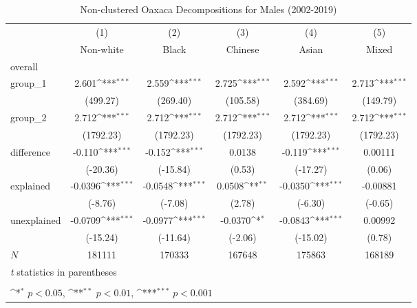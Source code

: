 \begin{table}[htbp]\centering
\def\sym#1{\ifmmode^{#1}\else\(^{#1}\)\fi}
\caption{Non-clustered Oaxaca Decompositions for Males (2002-2019)\label{tab1}}
\begin{tabular}{l*{5}{c}}
\hline\hline
            &\multicolumn{1}{c}{(1)}&\multicolumn{1}{c}{(2)}&\multicolumn{1}{c}{(3)}&\multicolumn{1}{c}{(4)}&\multicolumn{1}{c}{(5)}\\
            &\multicolumn{1}{c}{Non-white}&\multicolumn{1}{c}{Black}&\multicolumn{1}{c}{Chinese}&\multicolumn{1}{c}{Asian}&\multicolumn{1}{c}{Mixed}\\
\hline
overall     &                     &                     &                     &                     &                     \\
group\_1     &       2.601\sym{***}&       2.559\sym{***}&       2.725\sym{***}&       2.592\sym{***}&       2.713\sym{***}\\
            &    (499.27)         &    (269.40)         &    (105.58)         &    (384.69)         &    (149.79)         \\
group\_2     &       2.712\sym{***}&       2.712\sym{***}&       2.712\sym{***}&       2.712\sym{***}&       2.712\sym{***}\\
            &   (1792.23)         &   (1792.23)         &   (1792.23)         &   (1792.23)         &   (1792.23)         \\
difference  &      -0.110\sym{***}&      -0.152\sym{***}&      0.0138         &      -0.119\sym{***}&     0.00111         \\
            &    (-20.36)         &    (-15.84)         &      (0.53)         &    (-17.27)         &      (0.06)         \\
explained   &     -0.0396\sym{***}&     -0.0548\sym{***}&      0.0508\sym{**} &     -0.0350\sym{***}&    -0.00881         \\
            &     (-8.76)         &     (-7.08)         &      (2.78)         &     (-6.30)         &     (-0.65)         \\
unexplained &     -0.0709\sym{***}&     -0.0977\sym{***}&     -0.0370\sym{*}  &     -0.0843\sym{***}&     0.00992         \\
            &    (-15.24)         &    (-11.64)         &     (-2.06)         &    (-15.02)         &      (0.78)         \\
\hline
\(N\)       &      181111         &      170333         &      167648         &      175863         &      168189         \\
\hline\hline
\multicolumn{6}{l}{\footnotesize \textit{t} statistics in parentheses}\\
\multicolumn{6}{l}{\footnotesize \label{tab:oaxaca\_male\_nonclustered}}\\
\multicolumn{6}{l}{\footnotesize \sym{*} \(p<0.05\), \sym{**} \(p<0.01\), \sym{***} \(p<0.001\)}\\
\end{tabular}
\end{table}
